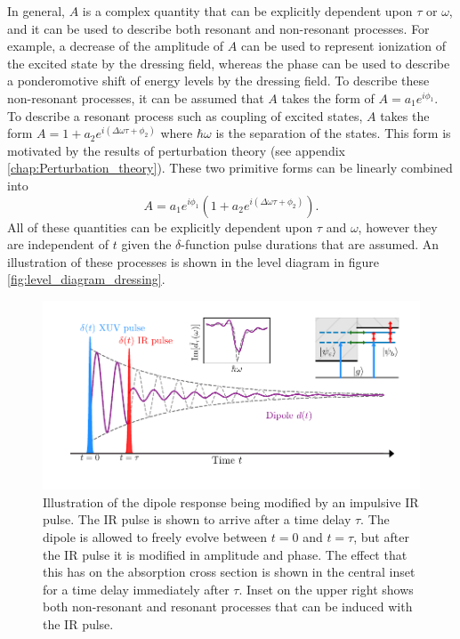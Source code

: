 In general, $A$ is a complex quantity that can be explicitly dependent upon $\tau$ or $\omega$, and it can  be used to describe both resonant and non-resonant processes.  For example, a decrease of the amplitude of $A$ can be used to represent ionization of the excited state by the dressing field, whereas the phase can be used to describe a ponderomotive shift of energy levels by the dressing field.  To describe these non-resonant processes, it can be assumed that $A$ takes the form of $A=a_1e^{i\phi_1}$.  To describe a resonant process such as coupling of excited states, $A$ takes the form $A=1+a_2e^{i(\Delta\omega\tau+\phi_2)}$ where $\hbar\omega$ is the separation of the states.  This form is motivated by the results of perturbation theory (see appendix \ref{chap:Perturbation_theory}).  These two primitive forms can be linearly combined into
\begin{equation}
	A=a_1e^{i\phi_1}(1+a_2e^{i(\Delta\omega\tau+\phi_2)}).
\end{equation}
All of these quantities can be explicitly dependent upon $\tau$ and $\omega$, however they are independent of $t$ given the $\delta$-function pulse durations that are assumed. An illustration of these processes is shown in the level diagram in figure \ref{fig:level_diagram_dressing}.

\begin{figure}
	\centering
	\includegraphics[width=1.0\textwidth]{figures/ATS/dipole_sketch_dressing.pdf}
	\caption{Illustration of the dipole response being modified by an impulsive IR pulse.  The IR pulse is shown to arrive after a time delay $\tau$.  The dipole is allowed to freely evolve between $t=0$ and $t=\tau$, but after the IR pulse it is modified in amplitude and phase.  The effect that this has on the absorption cross section is shown in the central inset for a time delay immediately after $\tau$.  Inset on the upper right shows both non-resonant and resonant processes that can be induced with the IR pulse.}
	\label{fig:dipole_sketch_dressing}
\end{figure}

